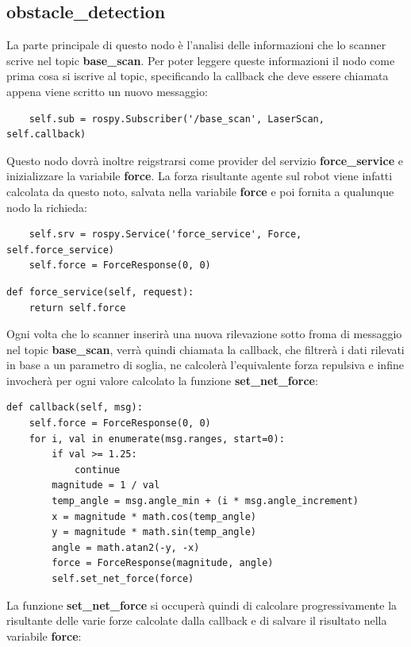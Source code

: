 \documentclass[Lau, binding=0.6cm, oneside]{sapthesis}
\begin{document}
\subsection{obstacle\_detection}
La parte principale di questo nodo è l'analisi delle informazioni che lo scanner scrive nel topic \textbf{base\_scan}.
Per poter leggere queste informazioni il nodo come prima cosa si iscrive al topic, specificando la callback che deve essere chiamata appena viene scritto un nuovo messaggio:

\begin{lstlisting}
	self.sub = rospy.Subscriber('/base_scan', LaserScan, self.callback)
\end{lstlisting}

Questo nodo dovrà inoltre reigstrarsi come provider del servizio \textbf{force\_service} e inizializzare la variabile \textbf{force}.
La forza risultante agente sul robot viene infatti calcolata da questo noto, salvata nella variabile \textbf{force} e poi fornita a qualunque nodo la richieda:

\begin{lstlisting}
    self.srv = rospy.Service('force_service', Force, self.force_service)
    self.force = ForceResponse(0, 0)
\end{lstlisting}

\begin{lstlisting}
def force_service(self, request):
    return self.force
\end{lstlisting}

Ogni volta che lo scanner inserirà una nuova rilevazione sotto froma di messaggio nel topic \textbf{base\_scan}, verrà quindi chiamata la callback, che filtrerà i dati rilevati in base a un parametro di soglia, ne calcolerà l'equivalente forza repulsiva e infine invocherà per ogni valore calcolato la funzione \textbf{set\_net\_force}:

\begin{lstlisting}
def callback(self, msg):
    self.force = ForceResponse(0, 0)
    for i, val in enumerate(msg.ranges, start=0):
        if val >= 1.25:
            continue
        magnitude = 1 / val
        temp_angle = msg.angle_min + (i * msg.angle_increment)
        x = magnitude * math.cos(temp_angle)
        y = magnitude * math.sin(temp_angle)
        angle = math.atan2(-y, -x)
        force = ForceResponse(magnitude, angle)
        self.set_net_force(force)
\end{lstlisting}

La funzione \textbf{set\_net\_force} si occuperà quindi di calcolare progressivamente la risultante delle varie forze calcolate dalla callback e di salvare il risultato nella variabile \textbf{force}:
\end{document}
